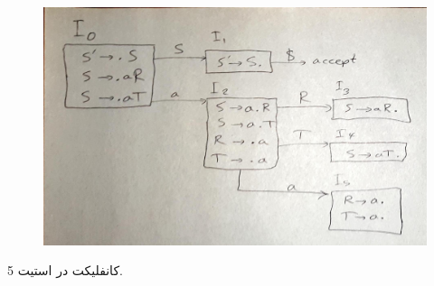 \documentclass{article}
\begin{document}
\begin{figure}[H]
    \centering
    \includegraphics[width=1.0\textwidth]{figures/7b.jpg}
    \caption
	{}
    \label{fig:fig1}
\end{figure}

کانفلیکت در استیت 5.


\section{}%



\section{}%
\end{document}

